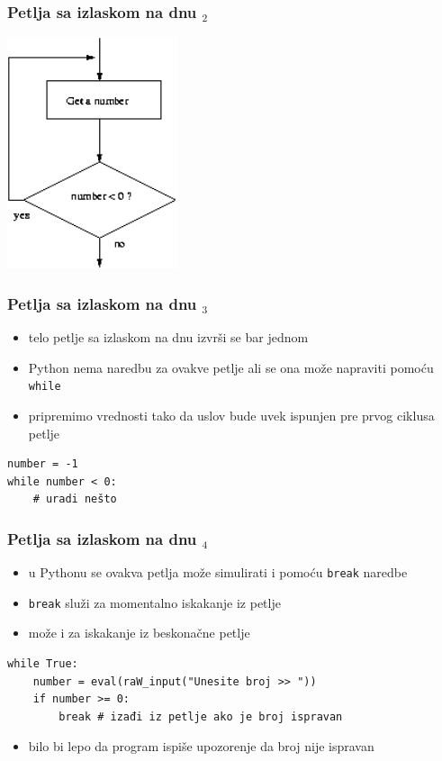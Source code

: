 \documentclass[utf8,compress]{beamer}
\begin{document}
\begin{frame}[fragile]
  \frametitle{Petlja sa izlaskom na dnu $_2$}
  \begin{center}
    \includegraphics[width=5cm]{pic20}
  \end{center}
\end{frame}

\begin{frame}[fragile]
  \frametitle{Petlja sa izlaskom na dnu $_3$}
  \begin{itemize}
    \item telo petlje sa izlaskom na dnu izvrši se  bar jednom
    \item Python nema naredbu za ovakve petlje ali se ona može napraviti pomoću \texttt{while}
    \item pripremimo vrednosti tako da uslov bude uvek ispunjen pre prvog ciklusa petlje
  \end{itemize}
\begin{verbatim}
number = -1
while number < 0:
    # uradi nešto
\end{verbatim}
\end{frame}

\begin{frame}[fragile]
  \frametitle{Petlja sa izlaskom na dnu $_4$}
  \begin{itemize}
    \item u Pythonu se ovakva petlja može simulirati i pomoću \texttt{break} naredbe
    \item \texttt{break} služi za momentalno iskakanje iz petlje
    \item može i za iskakanje iz beskonačne petlje
  \end{itemize}
\begin{verbatim}
while True:
    number = eval(raW_input("Unesite broj >> "))
    if number >= 0: 
        break # izađi iz petlje ako je broj ispravan
\end{verbatim}
  \begin{itemize}
    \item bilo bi lepo da program ispiše upozorenje da broj nije ispravan
  \end{itemize}
\end{frame}
\end{document}
